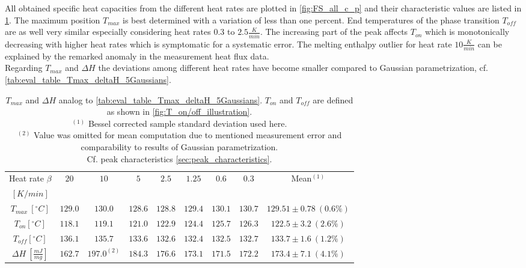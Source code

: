 \documentclass{scrartcl}[12pt, halfparskip]
\numberwithin{equation}{section}
\numberwithin{figure}{section}
\numberwithin{table}{section}
\begin{document}
All obtained specific heat capacities from the different heat rates are plotted in \cref{fig:FS_all_c_p} and their characteristic values are listed in \cref{tab:eval_table_Tmax_deltaH_FS}. The maximum position $T_{max}$ is best determined with a variation of less than one percent. End temperatures of the phase transition $T_{off}$ are as well very similar especially considering heat rates $0.3$ to $2.5 \frac{K}{min}$. The increasing part of the peak affects $T_{on}$ which is monotonically decreasing with higher heat rates which is symptomatic for a systematic error. The melting enthalpy outlier for heat rate $10 \frac{K}{min}$ can be explained by the remarked anomaly in the measurement heat flux data. \\
Regarding $T_{max}$ and $\Delta H$ the deviations among different heat rates have become smaller compared to Gaussian parametrization, cf. \cref{tab:eval_table_Tmax_deltaH_5Gaussians}.


\begin{table}[H]
	\centering
	\begin{tabular}{| c | c | c | c | c | c | c | c || c |} \hline
		Heat rate $\beta$ & $20$ & $10$ & $5$ & $2.5$ & $1.25$ & $0.6$ & $0.3$ & Mean$^{(1)}$ \\
		$[K/min]$ & & & & & & & & \\ \hline
		$T_{max} \ [^{\circ}C]$ & $129.0$ & $130.0$ & $128.6$ & $128.8$ & $129.4$ & $130.1$ & $130.7$ & $129.51 \pm 0.78 \ (0.6\%)$ \\[0.7ex]
		$T_{on} [^{\circ} C]$ & $118.1$ & $119.1$ & $121.0$ & $122.9$ & $124.4$ & $125.7$ & $126.3$ & $122.5 \pm 3.2 \ (2.6\%)$ \\[0.7ex]
		$T_{off} [^{\circ} C]$ & $136.1$ & $135.7$ & $133.6$ & $132.6$ & $132.4$ & $132.5$ & $132.7$ & $133.7 \pm 1.6 \ (1.2\%)$ \\[0.7ex]
		$\Delta H \ [\frac{mJ}{mg}]$ & $162.7$ & $197.0^{(2)}$ & $184.3$ & $176.6$ & $173.1$ & $171.5$ & $172.2$ & $173.4 \pm 7.1 \ (4.1\%)$ \\ \hline
	\end{tabular}
	\caption{$T_{max}$ and $\Delta H$ analog to \cref{tab:eval_table_Tmax_deltaH_5Gaussians}. $T_{on}$ and $T_{off}$ are defined as shown in \cref{fig:T_on/off_illustration}. \\
	$^{(1)}$ Bessel corrected sample standard deviation used here. \\
	$^{(2)}$ Value was omitted for mean computation due to mentioned measurement error and comparability to results of Gaussian parametrization. \\
	Cf. peak characteristics \cref{sec:peak_characteristics}.}
	\label{tab:eval_table_Tmax_deltaH_FS}
\end{table}
\end{document}
